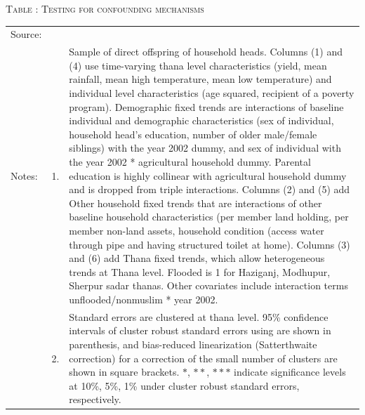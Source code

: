 \documentclass[12pt,letterpaper]{article}
\newcommand{\0}{\ensuremath{\mbox{\boldmath $0$}}}
\begin{document}



\begin{table}
\hfil\textsc{\footnotesize Table \thetable: Testing for confounding mechanisms \label{FloodNonMuslimResults}}\\
\setlength{\tabcolsep}{1pt}
\renewcommand{\arraystretch}{.75}
\hfil

\renewcommand{\arraystretch}{1}
\hfil\begin{tabular}{>{\hfill\scriptsize}p{1cm}<{}>{\hfill\scriptsize}p{.25cm}<{}>{\scriptsize}p{.7\paperwidth}<{\hfill}}
Source:& \multicolumn{2}{l}{\scriptsize Compiled from IFPRI data. }\\[-1ex]
Notes:& 1. & Sample of direct offspring of household heads. Columns \textsf{(1) and (4)} use time-varying thana level characteristics (yield, mean rainfall, mean high temperature, mean low temperature) and individual level characteristics (age squared, recipient of a poverty program). \textsf{Demographic fixed trends} are interactions of baseline individual and demographic characteristics (sex of individual, household head's education, number of older male/female siblings) with the year 2002 dummy, and sex of individual with the year 2002 * agricultural household dummy. Parental education is highly collinear with agricultural household dummy and is dropped from triple interactions. Columns \textsf{(2) and (5)} add \textsf{Other household fixed trends} that are interactions of other baseline household characteristics (per member land holding, per member non-land assets, household condition (access water through pipe and having structured toilet at home). Columns \textsf{(3) and (6)} add \textsf{Thana fixed trends}, which allow heterogeneous trends at Thana level.  \textsf{Flooded} is 1 for Haziganj, Modhupur, Sherpur sadar thanas. Other covariates include interaction terms \textsf{unflooded/nonmuslim * year 2002}. \\[-1ex]
& 2. & Standard errors are clustered at thana level. 95\% confidence intervals of cluster robust standard errors using \cite{liang1986longitudinal} are shown in parenthesis, and bias-reduced linearization (Satterthwaite correction) for a correction of the small number of clusters are shown in square brackets. $*$, $**$, $***$ indicate significance levels at 10\%, 5\%, 1\% under cluster robust standard errors, respectively. 
\end{tabular}
\end{table}
\end{document}
